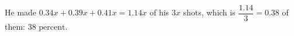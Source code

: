 He made \(0.34x+0.39x+0.41x=1.14x\) of his \(3x\) shots, which is \(\dfrac{1.14}{3}=0.38\) of them: \(\boxed{38\text{ percent}}\).
